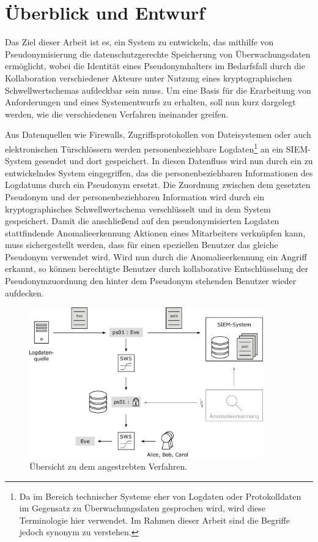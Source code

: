 \chapter{Überblick und Entwurf}
\label{cha_overview}

Das Ziel dieser Arbeit ist es, ein System zu entwickeln, das mithilfe von Pseudonymisierung die datenschutzgerechte Speicherung von Überwachungsdaten ermöglicht, wobei die Identität eines Pseudonymhalters im Bedarfsfall durch die Kollaboration verschiedener Akteure unter Nutzung eines kryptographischen Schwellwertschemas aufdeckbar sein muss. Um eine Basis für die Erarbeitung von Anforderungen und eines Systementwurfs zu erhalten, soll nun kurz dargelegt werden, wie die verschiedenen Verfahren ineinander greifen. 

Aus Datenquellen wie Firewalls, Zugriffsprotokollen von Dateisystemen oder auch elektronischen Türschlössern werden personenbeziehbare Logdaten\footnote{
  Da im Bereich technischer Systeme eher von Logdaten oder Protokolldaten im Gegensatz zu Überwachungsdaten gesprochen wird, wird diese Terminologie hier verwendet. Im Rahmen dieser Arbeit sind die Begriffe jedoch synonym zu verstehen.
} an ein SIEM-System gesendet und dort gespeichert. In diesen Datenfluss wird nun durch ein zu entwickelndes System eingegriffen, das die personenbeziehbaren Informationen des Logdatums durch ein Pseudonym ersetzt. Die Zuordnung zwischen dem gesetzten Pseudonym und der personenbeziehbaren Information wird durch ein kryptographisches Schwellwertschema verschlüsselt und in dem System gespeichert. Damit die anschließend auf den pseudonymisierten Logdaten stattfindende Anomalieerkennung Aktionen eines Mitarbeiters verknüpfen kann, muss sichergestellt werden, dass für einen speziellen Benutzer das gleiche Pseudonym verwendet wird. Wird nun durch die Anomalieerkennung ein Angriff erkannt, so können berechtigte Benutzer durch kollaborative Entschlüsselung der Pseudonymzuordnung den hinter dem Pseudonym stehenden Benutzer wieder aufdecken.

\begin{figure}[]
    \centering
        \includegraphics[width=0.9\textwidth]{dia/overview.pdf}
    \caption{Übersicht zu dem angestrebten Verfahren.}
    \label{fig:overview_initial}
\end{figure}

